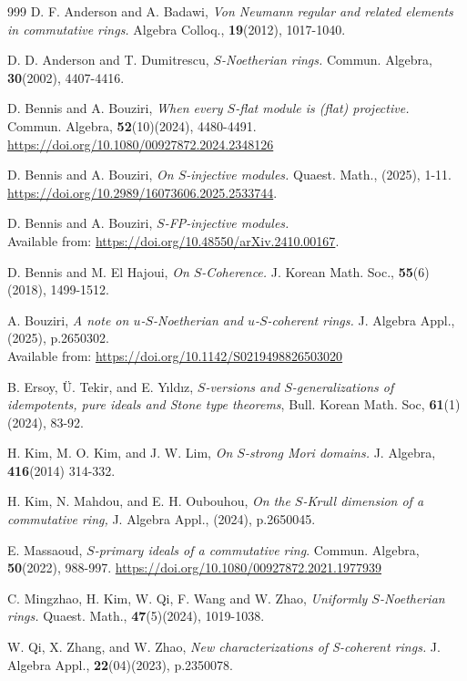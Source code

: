 \documentclass[12pt]{article}
\def\FP{{\rm FP}}
\begin{document}
 
\begin{thebibliography}{999}
 D. F. Anderson and A. Badawi, \textit{Von Neumann regular and related elements in commutative rings.} Algebra Colloq., \textbf{19}(2012), 1017-1040.

 D. D. Anderson and T. Dumitrescu, \textit{$S$-Noetherian rings.} Commun. Algebra, \textbf{30}(2002), 4407-4416.
  
 D. Bennis and A. Bouziri, \textit{When every $S$-flat module is (flat) projective.} Commun. Algebra, \textbf{52}(10)(2024), 4480-4491. \url{https://doi.org/10.1080/00927872.2024.2348126}

 D. Bennis and A. Bouziri, \textit{On $S$-injective modules.} Quaest. Math., (2025), 1-11. \url{https://doi.org/10.2989/16073606.2025.2533744}.

 D. Bennis and A. Bouziri, \textit{$S$-\FP-injective modules.} \\ Available from: 
\url{https://doi.org/10.48550/arXiv.2410.00167}.

 D. Bennis and M. El Hajoui, \textit{On $S$-Coherence.} J. Korean Math. Soc., \textbf{55}(6)(2018), 1499-1512.

  A. Bouziri, \textit{A note on $u$-$S$-Noetherian and $u$-$S$-coherent rings.} J. Algebra Appl., (2025), p.2650302. \\Available from: 
\url{https://doi.org/10.1142/S0219498826503020}

 
 B. Ersoy, Ü. Tekir, and E. Yıldız, \textit{$ S $-versions and $ S $-generalizations of idempotents, pure ideals and Stone type theorems}, Bull. Korean Math. Soc, \textbf{61}(1)(2024), 83-92.

 H. Kim, M. O. Kim, and  J. W. Lim,  \textit{On $S$-strong Mori domains.} J. Algebra, \textbf{416}(2014) 314-332.

 H. Kim, N. Mahdou, and  E. H. Oubouhou,  \textit{On the $S$-Krull dimension of a commutative ring,} J. Algebra Appl., (2024), p.2650045.


 E. Massaoud, \textit{$S$-primary ideals of a commutative ring}. Commun. Algebra, \textbf{50}(2022), 988-997. \url{https://doi.org/10.1080/00927872.2021.1977939}
 
 C. Mingzhao, H. Kim, W. Qi, F. Wang and W. Zhao, \textit{Uniformly $S$-Noetherian rings.} Quaest. Math., \textbf{47}(5)(2024), 1019-1038.


 W. Qi, X. Zhang, and W. Zhao, \textit{ New characterizations of S-coherent rings.} J. Algebra Appl., \textbf{22}(04)(2023), p.2350078.


\end{thebibliography}
\end{document}
